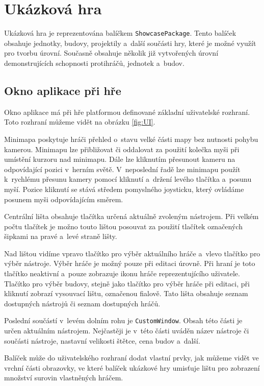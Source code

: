 \section{Ukázková hra}
Ukázková hra je reprezentována balíčkem \texttt{ShowcasePackage}. Tento balíček obsahuje jednotky, budovy, projektily a~další součásti hry, které je možné využít pro tvorbu úrovní. Současně obsahuje několik již vytvořených úrovní demonstrujících schopnosti protihráčů, jednotek a~budov.

\subsection{Okno aplikace při hře}
\label{sec:appwindow}
Okno aplikace má při hře platformou definované základní uživatelské rozhraní. Toto rozhraní můžeme vidět na obrázku \ref{fig:UI}. 

Minimapa poskytuje hráči přehled o~stavu velké části mapy bez nutnosti pohybu kamerou. Minimapu lze přibližovat či oddalovat za použití kolečka myši při umístění kurzoru nad minimapu. Dále lze kliknutím přesunout kameru na odpovídající pozici v~herním světě. V~neposlední řadě lze minimapu použít k~rychlému přesunu kamery pomocí kliknutí a~držení levého tlačítka a~posunu myší. Pozice kliknutí se stává středem pomyslného joysticku, který ovládáme posunem myši odpovídajícím směrem.

Centrální lišta obsahuje tlačítka určená aktuálně zvoleným nástrojem. Při velkém počtu tlačítek je možno touto lištou posouvat za použití tlačítek označených šipkami na pravé a~levé straně lišty.

Nad lištou vidíme vpravo tlačítko pro výběr aktuálního hráče a~vlevo tlačítko pro výběr nástroje. Výběr hráče je možný pouze při editaci úrovně. Při hraní je toto tlačítko neaktivní a~pouze zobrazuje ikonu hráče reprezentujícího uživatele. Tlačítko pro výběr budovy, stejně jako tlačítko pro výběr hráče při editaci, při kliknutí zobrazí vysouvací lištu, označenou fialově. Tato lišta obsahuje seznam dostupných nástrojů či seznam dostupných hráčů.

Poslední součástí v~levém dolním rohu je \texttt{CustomWindow}. Obsah této části je určen aktuálním nástrojem. Nejčastěji je v~této části uváděn název nástroje či součásti nástroje, nastavní velikosti štětce, cena budov a~další.

Balíček může do uživatelského rozhraní dodat vlastní prvky, jak můžeme vidět ve vrchní části obrazovky, ve které balíček ukázkové hry umisťuje lištu pro zobrazení množství surovin vlastněných hráčem.

